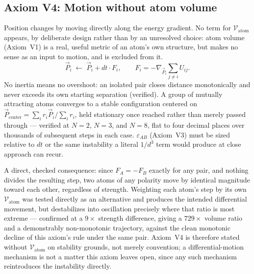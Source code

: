 \documentclass[12pt, a4paper]{article}
\begin{document}
\subsection{Axiom V4: Motion without atom volume}
\label{axiom:v4}
Position changes by moving directly along the energy gradient. No
term for $\mathcal{V}_{\text{atom}}$ appears, by deliberate design
rather than by an unresolved choice: atom volume (Axiom~V1) is a
real, useful metric of an atom's own structure, but makes no sense
as an input to motion, and is excluded from it.
\[
\vec P_i \;\leftarrow\; \vec P_i + dt\cdot F_i, \qquad
F_i = -\nabla_{\vec P_i}\sum_{j\ne i} U_{ij}.
\]
No inertia means no overshoot: an isolated pair closes distance
monotonically and never exceeds its own starting separation
(verified). A group of mutually attracting atoms converges to a
stable configuration centered on
$\vec P_{\text{center}}=\sum_i r_i\vec P_i / \sum_i r_i$, held
stationary once reached rather than merely passed through ---
verified at $N=2$, $N=3$, and $N=8$, flat to four decimal places
over thousands of subsequent steps in each case. $\varepsilon_{AB}$
(Axiom~V3) must be sized relative to $dt$ or the same instability a
literal $1/d^3$ term would produce at close approach can recur.

A direct, checked consequence: since $F_A=-F_B$ exactly for any
pair, and nothing divides the resulting step, two atoms of any
polarity move by identical magnitude toward each other, regardless
of strength. Weighting each atom's step by its own
$\mathcal{V}_{\text{atom}}$ was tested directly as an alternative
and produces the intended differential movement, but destabilizes
into oscillation precisely where that ratio is most extreme ---
confirmed at a $9\times$ strength difference, giving a $729\times$
volume ratio and a demonstrably non-monotonic trajectory, against
the clean monotonic decline of this axiom's rule under the same
pair. Axiom~V4 is therefore stated without $\mathcal{V}_{\text
{atom}}$ on stability grounds, not merely convention; a
differential-motion mechanism is not a matter this axiom leaves
open, since any such mechanism reintroduces the instability
directly.
\end{document}
